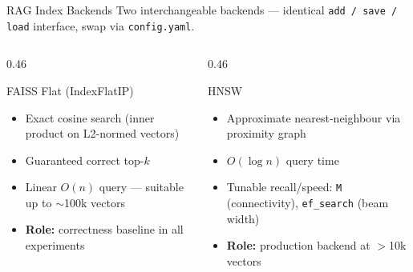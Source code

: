 \documentclass[aspectratio=169,10pt]{beamer}
\begin{document}
\begin{frame}{RAG Index Backends}
Two interchangeable backends — identical \texttt{add / save / load}
interface, swap via \texttt{config.yaml}.

\vspace{0.8em}
\begin{columns}[T]
\begin{column}{0.46\textwidth}
  \begin{block}{FAISS Flat (IndexFlatIP)}
    \begin{itemize}
      \item Exact cosine search (inner product on L2-normed vectors)
      \item Guaranteed correct top-$k$
      \item Linear $O(n)$ query — suitable up to $\sim$100k vectors
      \item \textbf{Role:} correctness baseline in all experiments
    \end{itemize}
  \end{block}
\end{column}
\begin{column}{0.46\textwidth}
  \begin{block}{HNSW}
    \begin{itemize}
      \item Approximate nearest-neighbour via proximity graph
      \item $O(\log n)$ query time
      \item Tunable recall/speed: \texttt{M} (connectivity),
        \texttt{ef\_search} (beam width)
      \item \textbf{Role:} production backend at $>$10k vectors
    \end{itemize}
  \end{block}
\end{column}
\end{columns}

\vspace{1em}
\centering
{}
\end{frame}
\end{document}
